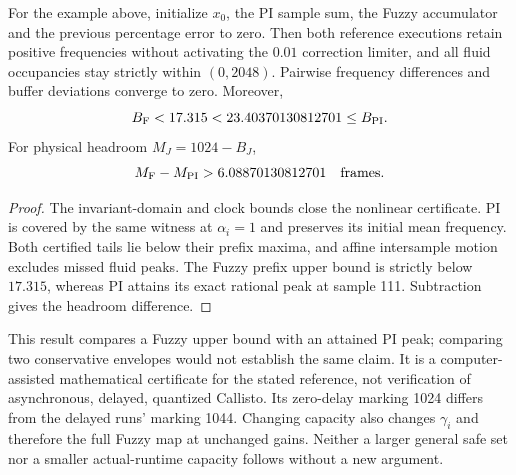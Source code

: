 \begin{btdtheorem}
\label{thm:btd_headroom}
For the example above, initialize $x_0$, the PI sample sum, the Fuzzy
accumulator and the previous percentage error to zero. Then both
reference executions retain positive frequencies without activating the
$0.01$ correction limiter, and all fluid occupancies stay strictly within
$(0,2048)$. Pairwise frequency differences and buffer deviations
converge to zero. Moreover,
\begin{equation}
 B_{\rm F}<17.315<23.40370130812701\le B_{\rm PI}.
 \label{eq:btd_strict_comparison}
\end{equation}
For physical headroom $M_J=1024-B_J$,
\begin{equation}
 M_{\rm F}-M_{\rm PI}>6.08870130812701\quad\text{frames}.
 \label{eq:btd_margin_improvement}
\end{equation}
\end{btdtheorem}
\begin{proof}
The invariant-domain and clock bounds close the nonlinear certificate.
PI is covered by the same witness at $\alpha_i=1$ and preserves its
initial mean frequency. Both certified tails lie below their prefix
maxima, and affine intersample motion excludes missed fluid peaks.
The Fuzzy prefix upper bound is strictly below $17.315$, whereas PI
attains its exact rational peak at sample 111. Subtraction gives the
headroom difference.
\end{proof}

This result compares a Fuzzy upper bound with an attained PI peak;
comparing two conservative envelopes would not establish the same claim.
It is a computer-assisted mathematical certificate for the stated
reference, not verification of asynchronous, delayed, quantized Callisto.
Its zero-delay marking 1024 differs from the delayed runs' marking 1044.
Changing capacity also changes $\gamma_i$ and therefore the full Fuzzy
map at unchanged gains. Neither a larger general safe set nor a smaller
actual-runtime capacity follows without a new argument.
